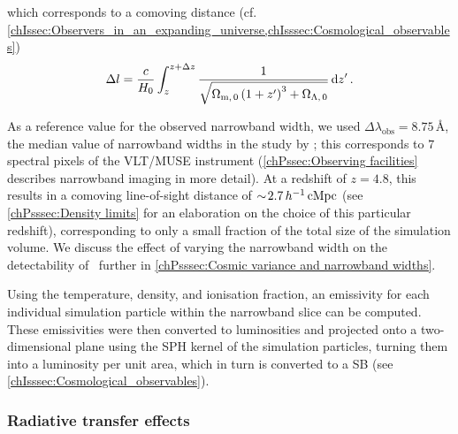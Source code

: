 \noindent which corresponds to a comoving distance (cf. \cref{chIssec:Observers_in_an_expanding_universe,chIsssec:Cosmological_observables})
\begin{equation}
    \Delta l = \frac{c}{H_0} \int_{z}^{z+\Delta z} \frac{1}{\sqrt{\Omega_{\text{m}, \, 0} \left( 1 + z' \right)^3 + \Omega_{\Lambda, \, 0}}} \dif z' \, .
\end{equation}

As a reference value for the observed narrowband width, we used $\Delta \lambda_\text{obs} = 8.75 \, \text{Å}$, the median value of narrowband widths in the study by \citet{2016A&A...587A..98W}; this corresponds to $7$ spectral pixels of the VLT/MUSE instrument (\cref{chPssec:Observing facilities} describes narrowband imaging in more detail). At a redshift of $z=4.8$, this results in a comoving line-of-sight distance of $\sim \! 2.7 \, h^{-1} \, \mathrm{cMpc}$ (see \cref{chPsssec:Density limits} for an elaboration on the choice of this particular redshift), corresponding to only a small fraction of the total size of the simulation volume. We discuss the effect of varying the narrowband width on the detectability of \lya\ further in \cref{chPsssec:Cosmic variance and narrowband widths}.

Using the temperature, density, and ionisation fraction, an emissivity for each individual simulation particle within the narrowband slice can be computed. These emissivities were then converted to luminosities and projected onto a two-dimensional plane using the SPH kernel of the simulation particles, turning them into a luminosity per unit area, which in turn is converted to a SB (see \cref{chIsssec:Cosmological_observables}).

\subsubsection{Radiative transfer effects}
\label{chPsssec:Radiative transfer effects}

